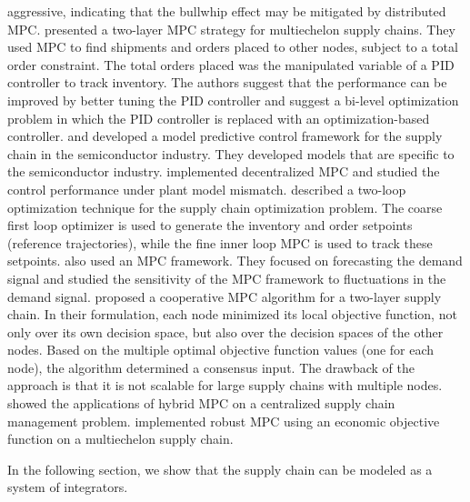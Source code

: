 aggressive, indicating  that the bullwhip effect may be
mitigated by distributed MPC. \citet{seferlis:giannelos:2004} presented a two-layer MPC strategy
for multiechelon supply chains. They used MPC to find shipments and
orders placed to other nodes, subject to a total order constraint. 
The total orders placed was the manipulated variable of a PID
controller to track inventory. The authors suggest that the performance can be improved by better tuning
the PID controller and suggest a bi-level optimization problem in
which the PID controller is replaced with an optimization-based
controller.  \citet{kempf:2004} and \citet{braun:rivera:carlyle:kempf:2002}  developed a
model predictive control framework for the supply chain in the semiconductor
industry. They developed models that are specific to the semiconductor
industry. \citet{braun:rivera:carlyle:kempf:2002}
implemented decentralized MPC and studied the control performance
under plant model mismatch.  \citet{kempf:2004}  described a two-loop optimization technique for
the supply chain optimization problem.  The coarse first loop
optimizer is used to generate the inventory and order setpoints
(reference trajectories), while the fine inner loop MPC is used to
track these setpoints. \citet{bose:pekny:2000} also used an MPC
framework. They focused on forecasting the demand signal  and
studied the sensitivity of the MPC framework to fluctuations in the
demand signal. \citet{Maestre:Pena:Camacho:2009} proposed a
cooperative MPC algorithm for a two-layer supply chain. In their 
formulation, each node minimized its local objective function, not
only over its own decision space, but also over the decision spaces of
the other nodes. Based on the multiple optimal objective function
values (one for each node), the algorithm determined a consensus
input. The drawback of the approach is that it is not scalable for
large supply chains with multiple
nodes. \citet{bemporad:cairano:giorgetti:2005} showed the applications
of hybrid 
MPC \citep{bemporad:morari:1999} on a centralized supply chain management
problem. \citet{li:marlin:2009} implemented robust MPC using an
economic objective function on a multiechelon 
supply chain.

In the following section, we show that the supply chain can be modeled
as a system of integrators. 

